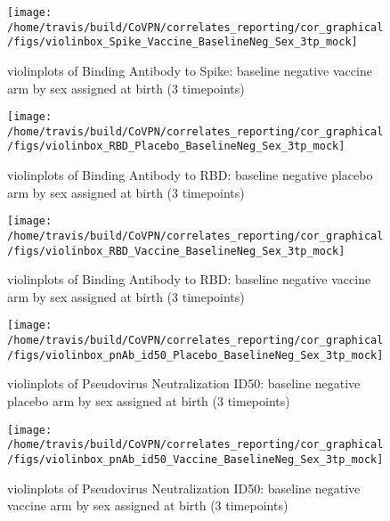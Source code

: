\documentclass[]{book}
\theoremstyle{definition}
\theoremstyle{definition}
\theoremstyle{definition}
\newcommand{\1}{\mathbbm{1}}
\begin{document}
\clearpage
\begin{figure}[H]

{\centering \texttt{[image: /home/travis/build/CoVPN/correlates\_reporting/cor\_graphical/figs/violinbox\_Spike\_Vaccine\_BaselineNeg\_Sex\_3tp\_mock]} 

}

\caption{violinplots of Binding Antibody to Spike: baseline negative vaccine arm by sex assigned at birth (3 timepoints)}\label{fig:unnamed-chunk-180}
\end{figure}

\clearpage
\begin{figure}[H]

{\centering \texttt{[image: /home/travis/build/CoVPN/correlates\_reporting/cor\_graphical/figs/violinbox\_RBD\_Placebo\_BaselineNeg\_Sex\_3tp\_mock]} 

}

\caption{violinplots of Binding Antibody to RBD: baseline negative placebo arm by sex assigned at birth (3 timepoints)}\label{fig:unnamed-chunk-181}
\end{figure}

\clearpage
\begin{figure}[H]

{\centering \texttt{[image: /home/travis/build/CoVPN/correlates\_reporting/cor\_graphical/figs/violinbox\_RBD\_Vaccine\_BaselineNeg\_Sex\_3tp\_mock]} 

}

\caption{violinplots of Binding Antibody to RBD: baseline negative vaccine arm by sex assigned at birth (3 timepoints)}\label{fig:unnamed-chunk-182}
\end{figure}

\clearpage
\begin{figure}[H]

{\centering \texttt{[image: /home/travis/build/CoVPN/correlates\_reporting/cor\_graphical/figs/violinbox\_pnAb\_id50\_Placebo\_BaselineNeg\_Sex\_3tp\_mock]} 

}

\caption{violinplots of Pseudovirus Neutralization ID50: baseline negative placebo arm by sex assigned at birth (3 timepoints)}\label{fig:unnamed-chunk-183}
\end{figure}

\clearpage
\begin{figure}[H]

{\centering \texttt{[image: /home/travis/build/CoVPN/correlates\_reporting/cor\_graphical/figs/violinbox\_pnAb\_id50\_Vaccine\_BaselineNeg\_Sex\_3tp\_mock]} 

}

\caption{violinplots of Pseudovirus Neutralization ID50: baseline negative vaccine arm by sex assigned at birth (3 timepoints)}\label{fig:unnamed-chunk-184}
\end{figure}
\end{document}
